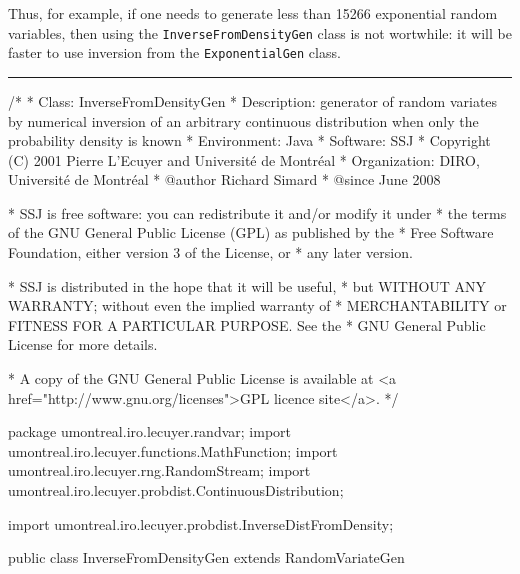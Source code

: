 Thus, for example, if one needs to generate less than 15266 exponential
random variables, then using the \texttt{InverseFromDensityGen} class
is not wortwhile: it will be faster to use inversion from the
\texttt{ExponentialGen} class.


\bigskip\hrule

\begin{code}
\begin{hide}
/*
 * Class:        InverseFromDensityGen
 * Description:  generator of random variates by numerical inversion of
                 an arbitrary continuous distribution when only the 
                 probability density is known
 * Environment:  Java
 * Software:     SSJ 
 * Copyright (C) 2001  Pierre L'Ecuyer and Université de Montréal
 * Organization: DIRO, Université de Montréal
 * @author       Richard Simard
 * @since        June 2008

 * SSJ is free software: you can redistribute it and/or modify it under
 * the terms of the GNU General Public License (GPL) as published by the
 * Free Software Foundation, either version 3 of the License, or
 * any later version.

 * SSJ is distributed in the hope that it will be useful,
 * but WITHOUT ANY WARRANTY; without even the implied warranty of
 * MERCHANTABILITY or FITNESS FOR A PARTICULAR PURPOSE.  See the
 * GNU General Public License for more details.

 * A copy of the GNU General Public License is available at
   <a href="http://www.gnu.org/licenses">GPL licence site</a>.
 */
\end{hide}
package umontreal.iro.lecuyer.randvar;
   import umontreal.iro.lecuyer.functions.MathFunction;
   import umontreal.iro.lecuyer.rng.RandomStream;
   import umontreal.iro.lecuyer.probdist.ContinuousDistribution;\begin{hide}
   import umontreal.iro.lecuyer.probdist.InverseDistFromDensity;
\end{hide}


public class InverseFromDensityGen extends RandomVariateGen \begin{hide} {
\end{hide}\end{code}

